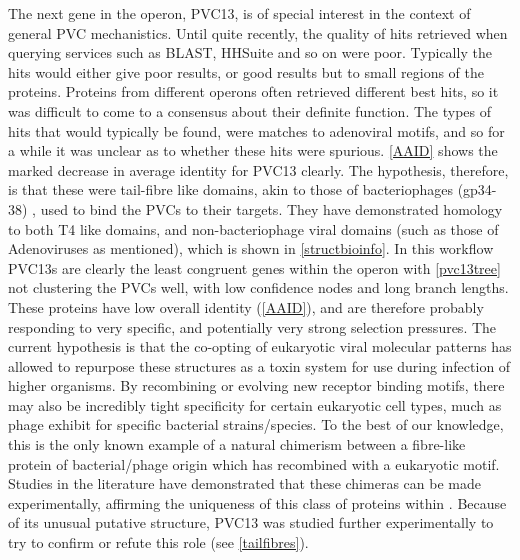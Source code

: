 The next gene in the operon, PVC13, is of special interest in the context of general PVC mechanistics. Until quite recently, the quality of hits retrieved when querying services such as BLAST, HHSuite and so on were poor. Typically the hits would either give poor results, or good results but to small regions of the proteins. Proteins from different operons often retrieved different best hits, so it was difficult to come to a consensus about their definite function. The types of hits that would typically be found, were matches to adenoviral motifs, and so for a while it was unclear as to whether these hits were spurious. \vref{AAID} shows the marked decrease in average identity for PVC13 clearly. The hypothesis, therefore, is that these were tail-fibre like domains, akin to those of bacteriophages (gp34-38) \citep{Bartual2010, Leiman2010}, used to bind the PVCs to their targets. They have demonstrated homology to both T4 like domains, and non-bacteriophage viral domains (such as those of Adenoviruses as mentioned), which is shown in \vref{structbioinfo}. In this workflow PVC13s are clearly the least congruent genes within the operon with \vref{pvc13tree} not clustering the PVCs well, with low confidence nodes and long branch lengths. These proteins have low overall identity (\vref{AAID}), and are therefore probably responding to very specific, and potentially very strong selection pressures. The current hypothesis is that the co-opting of eukaryotic viral molecular patterns has allowed \Pa{} to repurpose these structures as a toxin system for use during infection of higher organisms. By recombining or evolving new receptor binding motifs, there may also be incredibly tight specificity for certain eukaryotic cell types, much as phage exhibit for specific bacterial strains/species. To the best of our knowledge, this is the only known example of a natural chimerism between a fibre-like protein of bacterial/phage origin which has recombined with a eukaryotic motif. Studies in the literature have demonstrated that these chimeras can be made experimentally, affirming the uniqueness of this class of proteins within \Pa{} \citep{Papanikolopoulou2004}. Because of its unusual putative structure, PVC13 was studied further experimentally to try to confirm or refute this role (see \vref{tailfibres}).

